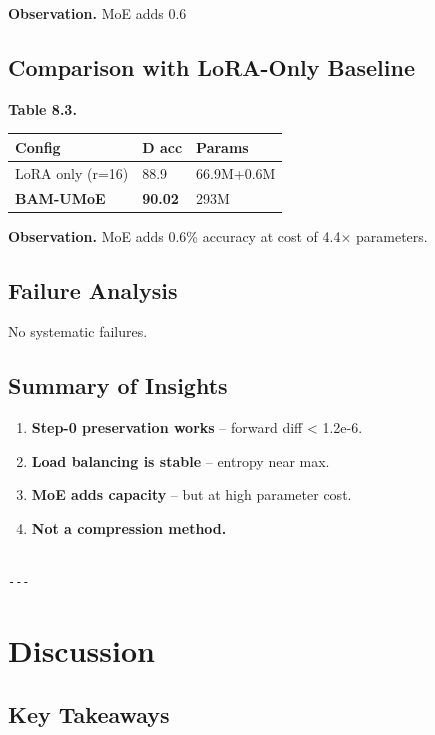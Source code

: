 \textbf{Observation.} MoE adds 0.6%

\subsection{Comparison with LoRA-Only Baseline}

\textbf{Table 8.3.}

\begin{table}[H]
\centering
\small
\begin{tabular}{lll}
\toprule
\textbf{Config} & \textbf{D acc} & \textbf{Params} \\
\midrule
LoRA only (r=16) & 88.9 & 66.9M+0.6M \\
\textbf{BAM-UMoE} & \textbf{90.02} & 293M \\
\bottomrule
\end{tabular}
\end{table}

\textbf{Observation.} MoE adds 0.6\% accuracy at cost of 
4.4$\times$ parameters.

\subsection{Failure Analysis}

No systematic failures.

\subsection{Summary of Insights}

\begin{enumerate}
\item \textbf{Step-0 preservation works} -- forward diff < 1.2e-6.
\item \textbf{Load balancing is stable} -- entropy near max.
\item \textbf{MoE adds capacity} -- but at high parameter cost.
\item \textbf{Not a compression method.}
\end{enumerate}
\begin{lstlisting}

---
\end{lstlisting}

\section{Discussion}

\subsection{Key Takeaways}

